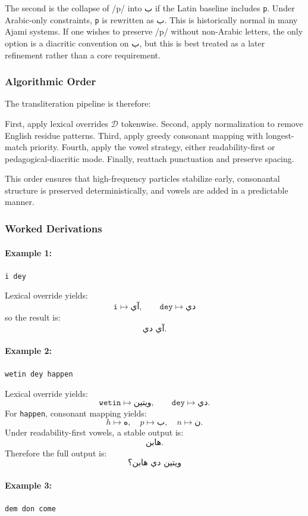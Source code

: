 \documentclass[12pt]{article}
\begin{document}
The second is the collapse of /p/ into ب if the Latin baseline includes \texttt{p}. Under Arabic-only constraints, \texttt{p} is rewritten as ب. This is historically normal in many Ajami systems. If one wishes to preserve /p/ without non-Arabic letters, the only option is a diacritic convention on ب, but this is best treated as a later refinement rather than a core requirement.

\subsubsection{Algorithmic Order}

The transliteration pipeline is therefore:

First, apply lexical overrides $\mathcal{D}$ tokenwise. Second, apply normalization to remove English residue patterns. Third, apply greedy consonant mapping with longest-match priority. Fourth, apply the vowel strategy, either readability-first or pedagogical-diacritic mode. Finally, reattach punctuation and preserve spacing.

This order ensures that high-frequency particles stabilize early, consonantal structure is preserved deterministically, and vowels are added in a predictable manner.

\subsubsection{Worked Derivations}

\paragraph{Example 1:} \texttt{i dey}

Lexical override yields:
\[
\texttt{i} \mapsto \text{آي},\qquad \texttt{dey} \mapsto \text{دي}
\]
so the result is:
\[
\text{آي دي}.
\]

\paragraph{Example 2:} \texttt{wetin dey happen}

Lexical override yields:
\[
\texttt{wetin} \mapsto \text{ويتين},\qquad \texttt{dey} \mapsto \text{دي}.
\]
For \texttt{happen}, consonant mapping yields:
\[
h \mapsto ه,\quad p \mapsto ب,\quad n \mapsto ن.
\]
Under readability-first vowels, a stable output is:
\[
\text{هابن}.
\]
Therefore the full output is:
\[
\text{ويتين دي هابن؟}
\]

\paragraph{Example 3:} \texttt{dem don come}
\end{document}
